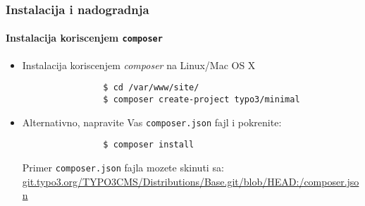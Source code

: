 \begin{frame}[fragile]
	\frametitle{Instalacija i nadogradnja}
	\framesubtitle{Instalacija koriscenjem \texttt{composer}}

	\begin{itemize}
		\item Instalacija koriscenjem \textit{composer} na Linux/Mac OS X

			\begin{lstlisting}
				$ cd /var/www/site/
				$ composer create-project typo3/minimal
			\end{lstlisting}

		\item Alternativno, napravite Vas \texttt{composer.json} fajl i pokrenite:

			\begin{lstlisting}
				$ composer install
			\end{lstlisting}

			Primer \texttt{composer.json} fajla mozete skinuti sa:\newline
			\small
				\href{https://git.typo3.org/TYPO3CMS/Distributions/Base.git/blob/HEAD:/composer.json}{git.typo3.org/TYPO3CMS/Distributions/Base.git/blob/HEAD:/composer.json}
			\normalsize

	\end{itemize}
\end{frame}


